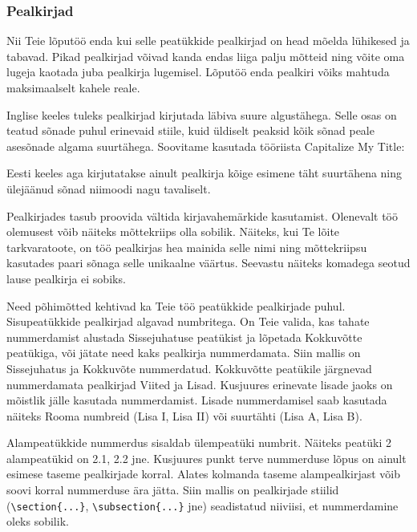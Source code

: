 \subsubsection{Pealkirjad}
Nii Teie lõputöö enda kui selle peatükkide pealkirjad on head mõelda lühikesed ja tabavad. Pikad pealkirjad võivad kanda endas liiga palju mõtteid ning võite oma lugeja kaotada juba pealkirja lugemisel. Lõputöö enda pealkiri võiks mahtuda maksimaalselt kahele reale.

Inglise keeles tuleks pealkirjad kirjutada läbiva suure algustähega. Selle osas on teatud sõnade puhul erinevaid stiile, kuid üldiselt peaksid kõik sõnad peale asesõnade algama suurtähega. Soovitame kasutada tööriista Capitalize My Title: 

Eesti keeles aga kirjutatakse ainult pealkirja kõige esimene täht suurtähena ning ülejäänud sõnad niimoodi nagu tavaliselt.

Pealkirjades tasub proovida vältida kirjavahemärkide kasutamist. Olenevalt töö olemusest võib näiteks mõttekriips olla sobilik. Näiteks, kui Te lõite tarkvaratoote, on töö pealkirjas hea mainida selle nimi ning mõttekriipsu kasutades paari sõnaga selle unikaalne väärtus. Seevastu näiteks komadega seotud lause pealkirja ei sobiks.

Need põhimõtted kehtivad ka Teie töö peatükkide pealkirjade puhul. Sisupeatükkide pealkirjad algavad numbritega. On Teie valida, kas tahate nummerdamist alustada Sissejuhatuse peatükist ja lõpetada Kokkuvõtte peatükiga, või jätate need kaks pealkirja nummerdamata. Siin mallis on Sissejuhatus ja Kokkuvõte nummerdatud. Kokkuvõtte peatükile järgnevad nummerdamata pealkirjad Viited ja Lisad. Kusjuures erinevate lisade jaoks on mõistlik jälle kasutada nummerdamist. Lisade nummerdamisel saab kasutada näiteks Rooma numbreid (Lisa I, Lisa II) või suurtähti (Lisa A, Lisa B).

Alampeatükkide nummerdus sisaldab ülempeatüki numbrit. Näiteks peatüki 2 alampeatükid on 2.1, 2.2 jne. Kusjuures punkt terve nummerduse lõpus on ainult esimese taseme pealkirjade korral. Alates kolmanda taseme alampealkirjast võib soovi korral nummerduse ära jätta. Siin mallis on pealkirjade stiilid (\verb|\section{...}|, \verb|\subsection{...}| jne) seadistatud niiviisi, et nummerdamine oleks sobilik.

